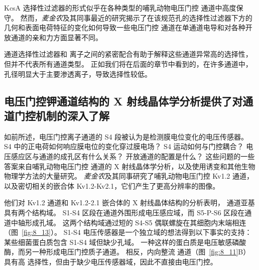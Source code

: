 KcsA 选择性过滤器的形式似乎在各种类型的哺乳动物电压门控  通道中高度保守。
然而，\textit{麦金农}及其同事最近的研究揭示了在该规范孔的选择性过滤器下方的几何和表面电荷特征的变化如何导致一些电压门控  通道在单通道电导和对各种开放通道的亲和力方面显著不同。


 通道选择性过滤器和  离子之间的紧密配合有助于解释这些通道异常高的选择性，但并不代表所有通道类型。
正如我们将在后面的章节中看到的，在许多通道中，孔径明显大于主要渗透离子，导致选择性较低。



\subsection{电压门控钾通道结构的 X 射线晶体学分析提供了对通道门控机制的深入了解}

如前所述，电压门控离子通道的 S4 段被认为是检测膜电位变化的电压传感器。
S4 中的正电荷如何响应膜电位的变化穿过膜电场？
S4 运动如何与门控耦合？
电压感应区与通道的成孔区有什么关系？
开放通道的配置是什么？
这些问题的一些答案来自哺乳动物电压门控  通道的 X 射线晶体学分析，以及使用诱变和其他生物物理学方法的大量研究。
\textit{麦金农}及其同事研究了哺乳动物电压门控 Kv1.2  通道，以及密切相关的嵌合体 Kv1.2-Kv2.1，它们产生了更高分辨率的图像。


他们对 Kv1.2 通道和 Kv1.2-2.1 嵌合体的 X 射线晶体结构的分析表明， 通道亚基具有两个结构域。
S1-S4 区段在通道外围形成电压感应域，而 S5-P-S6 区段在通道中轴形成孔域。
这两个结构域通过短的 S4-S5 偶联螺旋在其细胞内末端相连（图~\ref{fig:8_13}）。
S1-S4 电压传感器是一个独立域的想法得到以下事实的支持：某些细菌蛋白质包含 S1-S4 域但缺少孔域。
一种这样的蛋白质是电压敏感磷酸酶，而另一种形成电压门控质子通道。
相反，内向整流  通道（图~\ref{fig:8_11}B）具有高  选择性，但由于缺少电压传感器域，因此不直接由电压门控。


